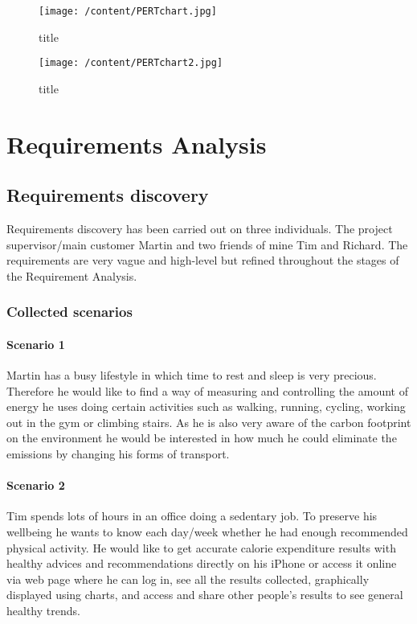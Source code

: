 \documentclass[12pt, a4paper]{report}   %
\begin{document}
\begin{enumerate}
\begin{figure}[H]
  \centering
	\texttt{[image: /content/PERTchart.jpg]}
	  \caption{title}
\end{figure}

\begin{figure}[H]
  \centering
	\texttt{[image: /content/PERTchart2.jpg]}
	  \caption{title}
\end{figure}


\chapter{Requirements Analysis}

\section{Requirements discovery}
Requirements discovery has been carried out on three individuals. The project supervisor/main customer Martin and two friends of mine Tim and Richard. The requirements are very vague and high-level but refined throughout the stages of the Requirement Analysis.

\subsection{Collected scenarios}
\subsubsection*{Scenario 1}
Martin has a busy lifestyle in which time to rest and sleep is very precious. Therefore he would like to find a way of measuring and controlling the amount of energy he uses doing certain activities such as walking, running, cycling, working out in the gym or climbing stairs. As he is also very aware of the carbon footprint on the environment he would be interested in how much he could eliminate the emissions by changing his forms of transport.

\subsubsection*{Scenario 2}
Tim spends lots of hours in an office doing a sedentary job. To preserve his wellbeing he wants to know each day/week whether he had enough recommended physical activity. He would like to get accurate calorie expenditure results with healthy advices and recommendations directly on his iPhone or access it online via web page where he can log in, see all the results collected, graphically displayed using charts, and access and share other people's results to see general healthy trends.



\end{enumerate}
\end{document}
